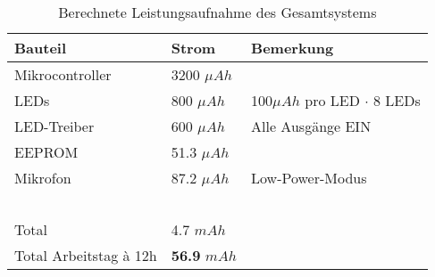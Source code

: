 ﻿	\begin{table}[!ht] 
		\centering
		\begin{tabular}{|l|l|l|}
			\hline
			\textbf{Bauteil} & \textbf{Strom} & \textbf{Bemerkung} \\ \hline
			Mikrocontroller & 3200 $\mu Ah$ & ~ \\ \hline
			LEDs & 800 $\mu Ah$ & 100$\mu Ah$ pro LED $\cdot$ 8 LEDs \\ \hline
			LED-Treiber & 600 $\mu Ah$ & Alle Ausgänge EIN \\ \hline
			EEPROM & 51.3 $\mu Ah$ & ~ \\ \hline
			Mikrofon & 87.2 $\mu Ah$ & Low-Power-Modus \\ \hline
			~ & ~ & ~ \\ \hline
			Total & 4.7 $mAh$ & ~ \\ \hline
			Total Arbeitstag à 12h & \textbf{56.9} $mAh$ & ~ \\ \hline
		\end{tabular}
		\caption{Berechnete Leistungsaufnahme des Gesamtsystems}
		\label{tab:leistung-berechnet}
	\end{table}